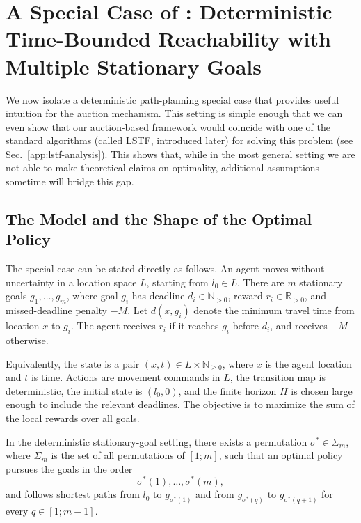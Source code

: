 \section{A Special Case of \momdps: Deterministic Time-Bounded Reachability with Multiple Stationary Goals}
\label{app:deterministic-path-planning}

We now  isolate a deterministic path-planning special case that provides useful intuition for the auction mechanism.
This setting is simple enough that we can even show that our auction-based framework would coincide with one of the standard algorithms (called LSTF, introduced later) for solving this problem (see Sec.~\ref{app:lstf-analysis}).
This shows that, while in the most general \momdp setting we are not able to make theoretical claims on optimality, additional assumptions sometime will bridge this gap.


\subsection{The Model and the Shape of the Optimal Policy}

The special case can be stated directly as follows.
An agent moves without uncertainty in a location space \(L\), starting from \(l_0\in L\).
There are \(m\) stationary goals \(g_1,\ldots,g_m\), where goal \(g_i\) has deadline \(d_i\in\mathbb{N}_{>0}\), reward \(r_i\in\mathbb{R}_{>0}\), and missed-deadline penalty \(-M\).
Let \(d(x,g_i)\) denote the minimum travel time from location \(x\) to \(g_i\).
The agent receives \(r_i\) if it reaches \(g_i\) before \(d_i\), and receives \(-M\) otherwise.

Equivalently, the state is a pair \((x,t)\in L\times\mathbb{N}_{\geq 0}\), where \(x\) is the agent location and \(t\) is time.
Actions are movement commands in \(L\), the transition map is deterministic, the initial state is \((l_0,0)\), and the finite horizon \(H\) is chosen large enough to include the relevant deadlines.
The objective is to maximize the sum of the local rewards over all goals.

\begin{proposition}\label{prop:scheduling is the optimal choice}
  In the deterministic stationary-goal setting, there exists a permutation \(\sigma^*\in\Sigma_m\), where \(\Sigma_m\) is the set of all permutations of \([1;m]\), such that an optimal policy pursues the goals in the order
  \[
    \sigma^*(1),\ldots,\sigma^*(m),
  \]
  and follows shortest paths from \(l_0\) to \(g_{\sigma^*(1)}\) and from \(g_{\sigma^*(q)}\) to \(g_{\sigma^*(q+1)}\) for every \(q\in[1;m-1]\).
\end{proposition}

